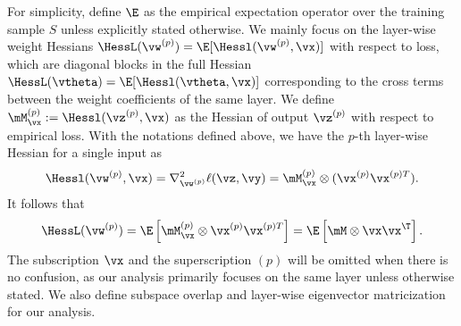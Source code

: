 For simplicity, define $\E$ as the empirical expectation operator over the training sample $S$ unless explicitly stated otherwise.
We mainly focus on the layer-wise weight Hessians $\HessL(\vw^{(p)}) = \E[\Hessl(\vw^{(p)}, \vx)]$ with respect to loss, which are diagonal blocks in the full Hessian $\HessL(\vtheta) = \E[\Hessl(\vtheta, \vx)]$ corresponding to the cross terms between the weight coefficients of the same layer.
We define $\mM_{\vx}^{(p)} := \Hessl(\vz^{(p)}, \vx)$
as the Hessian of output $\vz^{(p)}$ with respect to empirical loss.
With the notations defined above, we have the $p$-th layer-wise Hessian for a single input as
\begin{align}
    \Hessl(\vw^{(p)}, \vx) = \nabla^2_{\vw^{(p)}} \ell(\vz, \vy) = \mM_{\vx}^{(p)}\otimes (\vx^{(p)}\vx^{(p)T}).
\end{align}
It follows that
\begin{equation}
\HessL(\vw^{(p)}) = \E\left[\mM^{(p)}_{\vx}\otimes \vx^{(p)}\vx^{(p)T}\right] = \E\left[\mM \otimes\vx\vx^\T\right].\label{eqn:decomp}
\end{equation}
The subscription $\vx$ and the superscription $(p)$ will be omitted when there is no confusion, as our analysis primarily focuses on the same layer unless otherwise stated.
We also define subspace overlap and layer-wise eigenvector matricization for our analysis.
